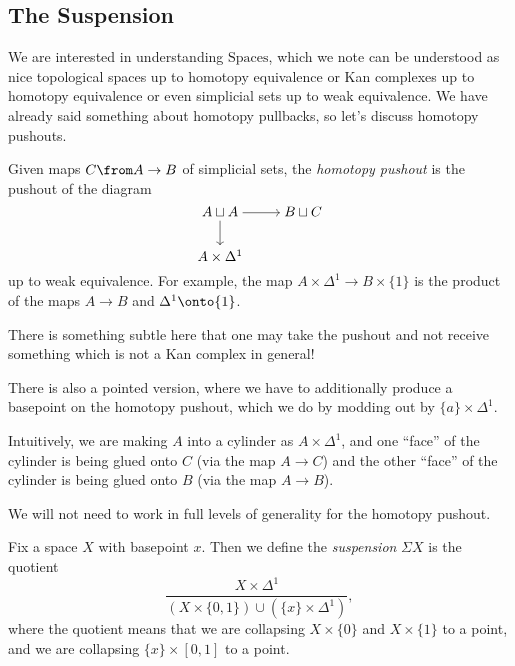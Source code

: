 \documentclass[../notes.tex]{subfiles}
\begin{document}
\subsection{The Suspension}
We are interested in understanding $\mathrm{Spaces}$, which we note can be understood as nice topological spaces up to homotopy equivalence or Kan complexes up to homotopy equivalence or even simplicial sets up to weak equivalence. We have already said something about homotopy pullbacks, so let's discuss homotopy pushouts.
\begin{definition}
	Given maps $C\from A\to B$ of simplicial sets, the \textit{homotopy push\-out} is the pushout of the diagram
	\[\begin{tikzcd}[cramped]
		{A\sqcup A} & {B\sqcup C} \\
		{A\times\Delta^1}
		\arrow[from=1-1, to=1-2]
		\arrow[from=1-1, to=2-1]
	\end{tikzcd}\]
	up to weak equivalence. For example, the map $A\times\Delta^1\to B\times\{1\}$ is the product of the maps $A\to B$ and $\Delta^1\onto\{1\}$.
\end{definition}
\begin{remark}
	There is something subtle here that one may take the pushout and not receive something which is not a Kan complex in general!
\end{remark}
\begin{remark}
	There is also a pointed version, where we have to additionally produce a basepoint on the homotopy pushout, which we do by modding out by $\{a\}\times\Delta^1$.
\end{remark}
\begin{remark}
	Intuitively, we are making $A$ into a cylinder as $A\times\Delta^1$, and one ``face'' of the cylinder is being glued onto $C$ (via the map $A\to C$) and the other ``face'' of the cylinder is being glued onto $B$ (via the map $A\to B$).
\end{remark}
We will not need to work in full levels of generality for the homotopy pushout.
\begin{definition}[suspension]
	Fix a space $X$ with basepoint $x$. Then we define the \textit{suspension} $\Sigma X$ is the quotient
	\[\frac{X\times\Delta^1}{(X\times\{0,1\})\cup\left(\{x\}\times\Delta^1\right)},\]
	where the quotient means that we are collapsing $X\times\{0\}$ and $X\times\{1\}$ to a point, and we are collapsing $\{x\}\times[0,1]$ to a point.
\end{definition}
\end{document}
